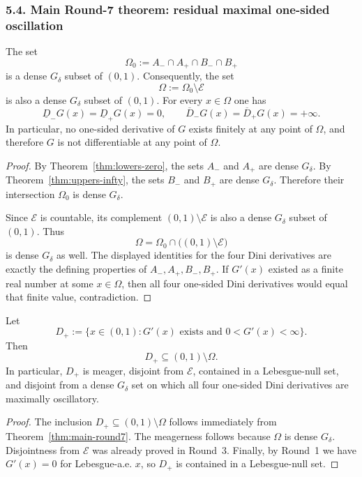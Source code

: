 \subsubsection*{5.4. Main Round-7 theorem: residual maximal one-sided oscillation}

\begin{theorem}\label{thm:main-round7}
The set
\[
\Omega_0:=A_-\cap A_+\cap B_-\cap B_+
\]
is a dense $G_\delta$ subset of $(0,1)$.
Consequently, the set
\[
\Omega:=\Omega_0\setminus\mathcal E
\]
is also a dense $G_\delta$ subset of $(0,1)$.
For every $x\in\Omega$ one has
\[
\underline D_-G(x)=\underline D_+G(x)=0,
\qquad
\overline D_-G(x)=\overline D_+G(x)=+\infty.
\]
In particular, no one-sided derivative of $G$ exists finitely at any point of $\Omega$, and therefore $G$ is not differentiable at any point of $\Omega$.
\end{theorem}

\begin{proof}
By Theorem~\ref{thm:lowers-zero}, the sets $A_-$ and $A_+$ are dense $G_\delta$.
By Theorem~\ref{thm:uppers-infty}, the sets $B_-$ and $B_+$ are dense $G_\delta$.
Therefore their intersection $\Omega_0$ is dense $G_\delta$.

Since $\mathcal E$ is countable, its complement $(0,1)\setminus\mathcal E$ is also a dense $G_\delta$ subset of $(0,1)$.
Thus
\[
\Omega=\Omega_0\cap\bigl((0,1)\setminus\mathcal E\bigr)
\]
is dense $G_\delta$ as well.
The displayed identities for the four Dini derivatives are exactly the defining properties of $A_-,A_+,B_-,B_+$.
If $G'(x)$ existed as a finite real number at some $x\in\Omega$, then all four one-sided Dini derivatives would equal that finite value, contradiction.
\end{proof}

\begin{corollary}\label{cor:sharper-obstruction}
Let
\[
D_+:=\{x\in(0,1): G'(x)\text{ exists and }0<G'(x)<\infty\}.
\]
Then
\[
D_+\subseteq (0,1)\setminus\Omega.
\]
In particular, $D_+$ is meager, disjoint from $\mathcal E$, contained in a Lebesgue-null set, and disjoint from a dense $G_\delta$ set on which all four one-sided Dini derivatives are maximally oscillatory.
\end{corollary}

\begin{proof}
The inclusion $D_+\subseteq(0,1)\setminus\Omega$ follows immediately from Theorem~\ref{thm:main-round7}.
The meagerness follows because $\Omega$ is dense $G_\delta$.
Disjointness from $\mathcal E$ was already proved in Round~3.
Finally, by Round~1 we have $G'(x)=0$ for Lebesgue-a.e. $x$, so $D_+$ is contained in a Lebesgue-null set.
\end{proof}

